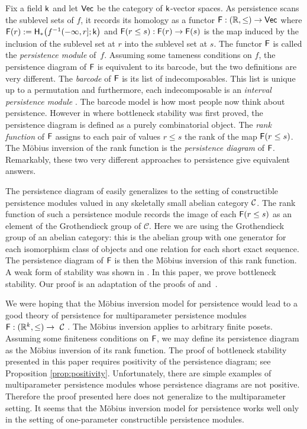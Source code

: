 \documentclass[12pt]{article}
\begin{document}
Fix a field $\mathsf{k}$ and let ${\mathsf{Vec}}$ be the category of $\mathsf{k}$-vector spaces.
As persistence scans the sublevel sets of $f$, it records its homology 
as a functor ${\mathsf{F}} : ({\mathbb R}, \leq) \to {\mathsf{Vec}}$ where
${\mathsf{F}}(r) := {\mathsf{H}}_\ast \big( f^{-1}(-\infty, r]; \mathsf{k} \big)$ and 
${\mathsf{F}}( r \leq s) : {\mathsf{F}}(r) \to {\mathsf{F}}(s)$ is the map induced by the inclusion of the
sublevel set at $r$ into the sublevel set at $s$.
The functor ${\mathsf{F}}$ is called the \emph{persistence module} of~$f$.
Assuming some tameness conditions on $f$, the persistence diagram of ${\mathsf{F}}$ is equivalent to its barcode,
but the two definitions are very different.
The \emph{barcode} of ${\mathsf{F}}$ is its list of indecomposables.
This list is unique up to a permutation and furthermore, each indecomposable is an
\emph{interval persistence module} \cite{ZC2005, Carlsson2010, Boevey}.
The barcode model is how most people now think about persistence.
However in \cite{CSEdH} where bottleneck stability was first proved, the persistence diagram
is defined as a purely combinatorial object.
The \emph{rank function} of ${\mathsf{F}}$ assigns to each pair of values $r \leq s$
the rank of the map ${\mathsf{F}}(r \leq s)$.
The M\"obius inversion of the rank function is the \emph{persistence diagram} of ${\mathsf{F}}$.
Remarkably, these two very different approaches to persistence give equivalent answers.

The persistence diagram of \cite{CSEdH} 
easily generalizes \cite{patel} to the setting of constructible persistence modules valued
in any skeletally small abelian category ${\mathcal{C}}$.
The rank function of such a persistence module records the image
of each ${\mathsf{F}}(r \leq s)$ as an element of the Grothendieck group
of $\mathcal{C}$.
Here we are using the Grothendieck group of an abelian category: this is the abelian group
with one generator for each isomorphism class of objects and one relation for each short exact sequence.
The persistence diagram of ${\mathsf{F}}$ is then the M\"obius inversion of this rank function.
A weak form of stability was shown in \cite{patel}.
In this paper, we prove bottleneck stability.
Our proof is an adaptation of the proofs of \cite{CSEdH} and~\cite{crazy_persistence}.

We were hoping that the M\"obius inversion model for persistence would lead to a 
good theory of persistence for multiparameter persistence modules 
${\mathsf{F}} : ({\mathbb R}^k, \leq) \to~{\mathcal{C}}$ \cite{Carlsson2009,Lesnick2015}.
The M\"obius inversion applies to arbitrary finite posets.
Assuming some finiteness conditions on ${\mathsf{F}}$, we may define its persistence diagram 
as the M\"obius inversion of its rank function.
The proof of bottleneck stability presented in this paper requires positivity of the persistence diagram;
see Proposition \ref{prop:positivity}.
Unfortunately, there are simple examples of multiparameter persistence modules
whose persistence diagrams are not positive.
Therefore the proof presented here does not generalize to the multiparameter setting.
It seems that the M\"obius inversion model for persistence works well only in the setting of 
one-parameter constructible persistence modules.
\end{document}
